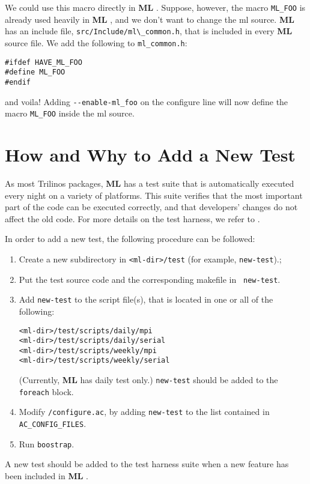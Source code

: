 \documentclass[10pt,letter,relax]{SANDreport}
\newcommand{\ML}     {{\bf ML }}
\begin{document}
We could use this macro directly in \ML.
Suppose, however, the macro \verb!ML_FOO! is already used
heavily in \ML, and we don't want to change the ml source.
\ML has an include file, \verb!src/Include/ml\_common.h!, that is included in
every \ML source file.
We add the following to \verb!ml_common.h!:
\begin{verbatim}
#ifdef HAVE_ML_FOO
#define ML_FOO
#endif
\end{verbatim}
and voila!   Adding \verb!--enable-ml_foo! on the configure line will now define the
macro \verb!ML_FOO! inside the ml source.


\section{How and Why to Add a New Test}
\label{sec:add_test}

As most Trilinos packages, \ML has a test suite that is automatically
executed every night on a variety of platforms.
This suite verifies
that the most important part of the code can be executed correctly, and
that developers' changes do not affect the old code.  For more details
on the test harness, we refer to \cite[Section 3.3]{Trilinos-Dev-Guide}.

In order to add a new test, the following procedure can be followed:
\begin{enumerate}
\item Create a new subdirectory in \verb!<ml-dir>/test! (for example,
  {\tt new-test}).;
\item Put the test source code and the corresponding makefile in {\tt
    new-test}.
\item Add {\tt new-test} to the script file(s), that is located in one or all
of the following:
\begin{verbatim}
<ml-dir>/test/scripts/daily/mpi
<ml-dir>/test/scripts/daily/serial
<ml-dir>/test/scripts/weekly/mpi
<ml-dir>/test/scripts/weekly/serial
\end{verbatim}
(Currently, \ML has daily test only.) {\tt new-test} should be added to
the {\tt foreach} block.
\item Modify {\tt <ml-dir>/configure.ac}, by adding {\tt new-test} to
  the list contained in {\tt AC\_CONFIG\_FILES}.
\item Run {\tt boostrap}.
\end{enumerate}

A new test should be added to the test harness suite when a new feature
has been included in \ML. 
\end{document}
